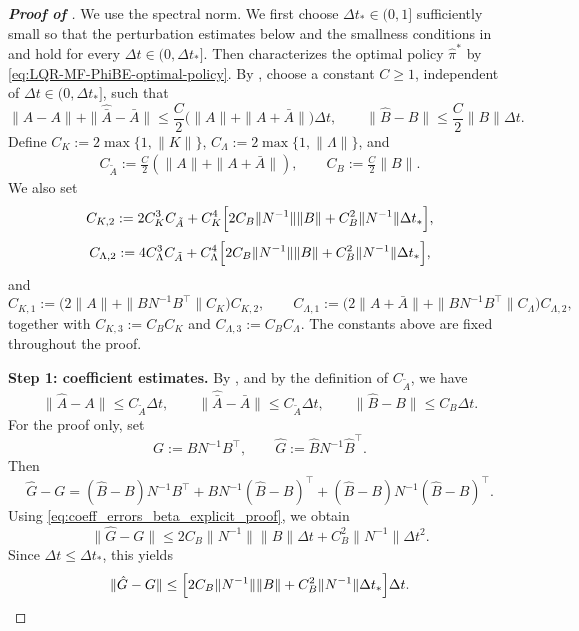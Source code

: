 \documentclass[a4paper, 10pt, english, reqno]{amsart}
\begin{document}
\begin{proof}[\textbf{Proof of }]
We use the spectral norm. We first choose $\Delta t_*\in(0,1]$ sufficiently small so that the perturbation estimates below and the smallness conditions in \cite[Theorem~3.1]{Sun1998} and  hold for every $\Delta t\in(0,\Delta t_*]$. Then  characterizes the
optimal policy $\hat\pi^*$ by
\eqref{eq:LQR-MF-PhiBE-optimal-policy}. By
, choose a constant $C\ge1$,
independent of $\Delta t\in(0,\Delta t_*]$, such that
\[
\|\hat A-A\|+\|\hat{\bar A}-\bar A\|
\le
\frac{C}{2}\bigl(\|A\|+\|A+\bar A\|\bigr)\Delta t,
\qquad
\|\hat B-B\|
\le
\frac{C}{2}\|B\|\Delta t.
\]
Define $C_K:=2\max\{1,\|K\|\}$,
$C_\Lambda:=2\max\{1,\|\Lambda\|\}$, and
\begin{align}
\label{eq:constant_C_A_b}
      C_{\tilde A}
  :=
  \frac{C}{2}(\|A\|+\|A+\bar A\|),
  \qquad
  C_B
  :=
  \frac{C}{2}\|B\|.
\end{align}
We also set
\begin{equation}
\label{eq:constant_C_K_2}
  C_{K,2}
  :=
  2C_K^3 C_{\tilde A}
  +
  C_K^4
  \Bigl[
    2C_B\|N^{-1}\|\|B\|
    +
    C_B^2\|N^{-1}\|\Delta t_*
  \Bigr],
\end{equation}
\begin{equation}
\label{eq:constant_C_lambd_2}
  C_{\Lambda,2}
  :=
  4C_\Lambda^3 C_{\tilde A}
  +
  C_\Lambda^4
  \Bigl[
    2C_B\|N^{-1}\|\|B\|
    +
    C_B^2\|N^{-1}\|\Delta t_*
  \Bigr],
\end{equation}
and
\begin{equation}
\label{eq:constant_C_K_1_C_Lambd_2}
  C_{K,1}
  :=
  \bigl(2\|A\|+\|BN^{-1}B^\top\|C_K\bigr)C_{K,2},
  \qquad
  C_{\Lambda,1}
  :=
  \bigl(2\|A+\bar A\|+\|BN^{-1}B^\top\|C_\Lambda\bigr)
  C_{\Lambda,2},
\end{equation}
together with $C_{K,3}:=C_BC_K$ and $C_{\Lambda,3}:=C_BC_\Lambda$. The constants above are fixed throughout the proof.

\medskip
\noindent
\textbf{Step 1: coefficient estimates.}
By , and by the definition of $C_{\tilde A}$, we have
\begin{equation}
\label{eq:coeff_errors_beta_explicit_proof}
  \|\hat A-A\|\le C_{\tilde A}\Delta t,
  \qquad
  \|\hat{\bar A}-\bar A\|\le C_{\tilde A}\Delta t,
  \qquad
  \|\hat B-B\|\le C_B\Delta t.
\end{equation}
For the proof only, set
\[
    G:=BN^{-1}B^\top,
    \qquad
    \hat G:=\hat B N^{-1}\hat B^\top.
\]
Then
\[
  \hat G-G
  =
  (\hat B-B)N^{-1}B^\top
  +
  BN^{-1}(\hat B-B)^\top
  +
  (\hat B-B)N^{-1}(\hat B-B)^\top.
\]
Using \eqref{eq:coeff_errors_beta_explicit_proof}, we obtain
\[
  \|\hat G-G\|
  \le
  2C_B\|N^{-1}\|\|B\|\Delta t
  +
  C_B^2\|N^{-1}\|\Delta t^2.
\]
Since $\Delta t\le \Delta t_*$, this yields
\begin{equation}
\label{eq:G_error_beta_explicit_proof}
  \|\hat G-G\|
  \le
  \Bigl[
    2C_B\|N^{-1}\|\|B\|
    +
    C_B^2\|N^{-1}\|\Delta t_*
  \Bigr]\Delta t.
\end{equation}


\end{proof}
\end{document}
